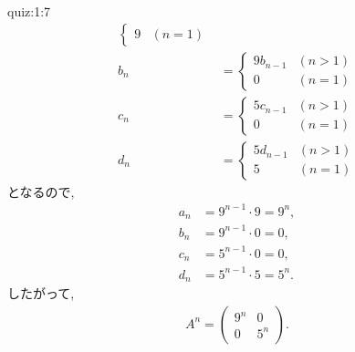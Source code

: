 \begin{answerof}{quiz:1:7}
\begin{align*}
\begin{cases}
      9&(n=1)
    \end{cases}\\
    b_n&=
    \begin{cases}
      9b_{n-1}&(n>1)\\
      0&(n=1)
    \end{cases}\\
    c_n&=
    \begin{cases}
      5c_{n-1}&(n>1)\\
      0&(n=1)
    \end{cases}\\
    d_n&=
    \begin{cases}
      5d_{n-1}&(n>1)\\
      5&(n=1)
    \end{cases}
  \end{align*}
  となるので,
  \begin{align*}
    a_n&=9^{n-1}\cdot 9=9^n,\\
    b_n&=9^{n-1}\cdot 0=0,\\
    c_n&=5^{n-1}\cdot 0=0,\\
    d_n&=5^{n-1}\cdot 5=5^n.
  \end{align*}
  したがって,
  \begin{align*}
    A^n=\begin{pmatrix}9^n&0\\0&5^n\end{pmatrix}.
  \end{align*}

\end{answerof}

